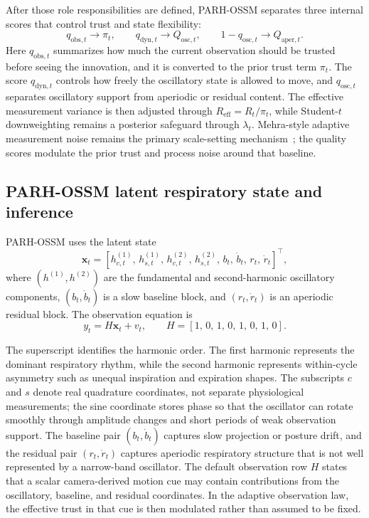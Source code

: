 \documentclass[fleqn,10pt]{wlscirep}
\newcommand{\state}{\mathbf{x}}
\newcommand{\obs}{y}
\newcommand{\Reff}{R_{\mathrm{eff}}}
\begin{document}
After those role responsibilities are defined, PARH-OSSM separates three
internal scores that control trust and state flexibility:
\begin{equation}
q_{\mathrm{obs},t} \rightarrow \pi_t,\qquad
q_{\mathrm{dyn},t} \rightarrow Q_{\mathrm{osc},t},\qquad
1-q_{\mathrm{osc},t} \rightarrow Q_{\mathrm{aper},t}.
\end{equation}
Here $q_{\mathrm{obs},t}$ summarizes how much the current observation should be
trusted before seeing the innovation, and it is converted to the prior trust
term $\pi_t$. The score $q_{\mathrm{dyn},t}$ controls how freely the
oscillatory state is allowed to move, and $q_{\mathrm{osc},t}$ separates
oscillatory support from aperiodic or residual content. The effective
measurement variance is then adjusted through
\(
\Reff = R_t / \pi_t
 \),
while Student-$t$ downweighting remains a posterior safeguard through
$\lambda_t$. Mehra-style adaptive measurement noise
remains the primary scale-setting mechanism~\cite{Mehra1970}; the quality
scores modulate the prior trust and process noise around that baseline.

\subsection*{PARH-OSSM latent respiratory state and inference}
PARH-OSSM uses the latent state
\begin{equation}
\state_t =
\left[
h_{c,t}^{(1)},\,
h_{s,t}^{(1)},\,
h_{c,t}^{(2)},\,
h_{s,t}^{(2)},\,
b_t,\,
\dot{b}_t,\,
r_t,\,
\dot{r}_t
\right]^\top,
\end{equation}
where $(h^{(1)}, h^{(2)})$ are the fundamental and second-harmonic oscillatory
components, $(b_t,\dot{b}_t)$ is a slow baseline block, and
$(r_t,\dot{r}_t)$ is an aperiodic residual block. The observation equation is
\begin{equation}
\obs_t = H \state_t + v_t, \qquad
H = [1,\,0,\,1,\,0,\,1,\,0,\,1,\,0].
\end{equation}

The superscript identifies the harmonic order. The first harmonic represents
the dominant respiratory rhythm, while the second harmonic represents
within-cycle asymmetry such as unequal inspiration and expiration shapes. The
subscripts $c$ and $s$ denote real quadrature coordinates, not separate
physiological measurements; the sine coordinate stores phase so that the
oscillator can rotate smoothly through amplitude changes and short periods of
weak observation support. The baseline pair $(b_t,\dot b_t)$ captures slow
projection or posture drift, and the residual pair $(r_t,\dot r_t)$ captures
aperiodic respiratory structure that is not well represented by a narrow-band
oscillator. The default observation row $H$ states that a scalar
camera-derived motion cue may contain contributions from the oscillatory,
baseline, and residual coordinates. In the adaptive observation law, the
effective trust in that cue is then modulated rather than assumed to be fixed.
\end{document}

